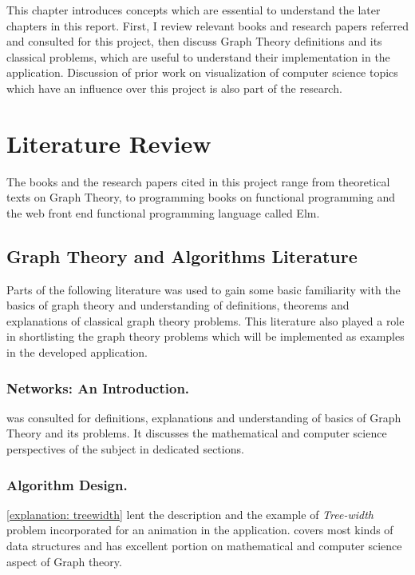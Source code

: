 
This chapter introduces concepts which are essential to understand the
later chapters in this report. First, I review relevant books and research papers referred and consulted for this project, then discuss Graph Theory definitions and its classical
problems, which are useful to understand their implementation in the application.
Discussion of prior work on visualization of computer science topics which have
an influence over this project is also part of the research.

\section{Literature Review}
The books and the research papers cited in this project range
from theoretical texts on Graph Theory, to programming books on functional
programming and the web front end functional programming language called
Elm.

\subsection{Graph Theory and Algorithms Literature}
Parts of the following literature was used to gain some basic familiarity with the
basics of graph theory and understanding of definitions, theorems and 
explanations of classical graph theory problems. This literature
also played a role in shortlisting the graph theory problems which  
will be implemented as examples in the developed application.

\subsubsection{Networks: An Introduction.}
\cite{Newman10} was consulted for definitions, explanations and understanding of
basics of Graph Theory and its problems. It discusses the mathematical and
computer science perspectives of the subject in dedicated sections.

\subsubsection{Algorithm Design.}
\autoref{explanation: treewidth} lent the description and the example of \emph{Tree-width} problem
incorporated for an animation in the application. \cite{KleinbergTardos06} covers most kinds of data structures and has excellent portion on mathematical and
computer science aspect of Graph theory.


